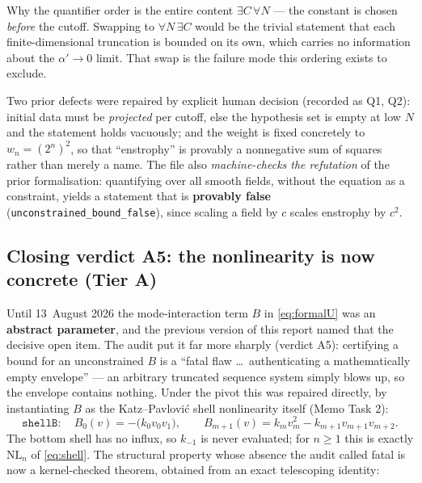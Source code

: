 \documentclass[11pt,a4paper]{article}
\newcommand{\tA}{\textcolor{TierA}{\textbf{Tier A}}}
\theoremstyle{definition}
\theoremstyle{plain}
\begin{document}
\begin{keybox}{Why the quantifier order is the entire content}
$\exists C\,\forall N$ --- the constant is chosen \emph{before} the cutoff. Swapping to
$\forall N\,\exists C$ would be the trivial statement that each finite-dimensional truncation
is bounded on its own, which carries no information about the $\alpha'\to0$ limit. That swap
is the failure mode this ordering exists to exclude.
\end{keybox}

Two prior defects were repaired by explicit human decision (recorded as Q1, Q2): initial data
must be \emph{projected} per cutoff, else the hypothesis set is empty at low $N$ and the
statement holds vacuously; and the weight is fixed concretely to $w_n=(2^n)^2$, so that
``enstrophy'' is provably a nonnegative sum of squares rather than merely a name. The file
also \emph{machine-checks the refutation} of the prior formalisation: quantifying over all
smooth fields, without the equation as a constraint, yields a statement that is
\textbf{provably false} (\texttt{unconstrained\_bound\_false}), since scaling a field by $c$
scales enstrophy by $c^2$.

\subsection{Closing verdict A5: the nonlinearity is now concrete (\tA{})}

Until 13~August 2026 the mode-interaction term $B$ in \eqref{eq:formalU} was an
\textbf{abstract parameter}, and the previous version of this report named that the decisive
open item. The audit put it far more sharply (verdict A5): certifying a bound for an
unconstrained $B$ is a ``fatal flaw \ldots\ authenticating a mathematically empty envelope''
--- an arbitrary truncated sequence system simply blows up, so the envelope contains nothing.
Under the pivot this was repaired directly, by instantiating $B$ as the Katz--Pavlovi\'c shell
nonlinearity itself (Memo Task 2):
\begin{equation}
\texttt{shellB}:\quad
B_0(v)=-\bigl(k_0v_0v_1\bigr),\qquad
B_{m+1}(v)=k_mv_m^2-k_{m+1}v_{m+1}v_{m+2}.
\label{eq:shellB}
\end{equation}
The bottom shell has no influx, so $k_{-1}$ is never evaluated; for $n\ge1$ this is exactly
$\mathrm{NL}_n$ of \eqref{eq:shell}. The structural property whose absence the audit called
fatal is now a kernel-checked theorem, obtained from an exact telescoping identity:
\end{document}
